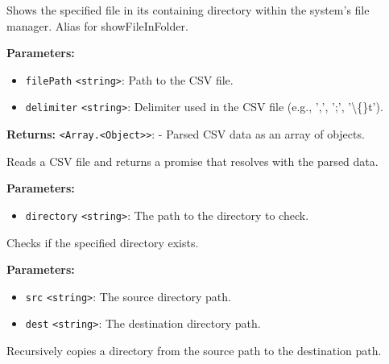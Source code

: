 \documentclass[12pt,a4paper]{article}
\begin{document}
\noindent Shows the specified file in its containing directory within the system's file manager. Alias for \textasciigrave{}showFileInFolder\textasciigrave{}.

\vspace{5mm}
\noindent {}


\noindent \textbf{Parameters:}
\begin{itemize}
  \item \texttt{filePath} \texttt{<string>}: Path to the CSV file.
  \item \texttt{delimiter} \texttt{<string>}: Delimiter used in the CSV file (e.g., ',', ';', '\textbackslash\{\}t').
\end{itemize}

\noindent \textbf{Returns:} \texttt{<Array.<Object>>}: - Parsed CSV data as an array of objects.

\noindent Reads a CSV file and returns a promise that resolves with the parsed data.

\vspace{5mm}
\noindent {}


\noindent \textbf{Parameters:}
\begin{itemize}
  \item \texttt{directory} \texttt{<string>}: The path to the directory to check.
\end{itemize}

\noindent Checks if the specified directory exists.

\vspace{5mm}
\noindent {}


\noindent \textbf{Parameters:}
\begin{itemize}
  \item \texttt{src} \texttt{<string>}: The source directory path.
  \item \texttt{dest} \texttt{<string>}: The destination directory path.
\end{itemize}

\noindent Recursively copies a directory from the source path to the destination path.
\end{document}
